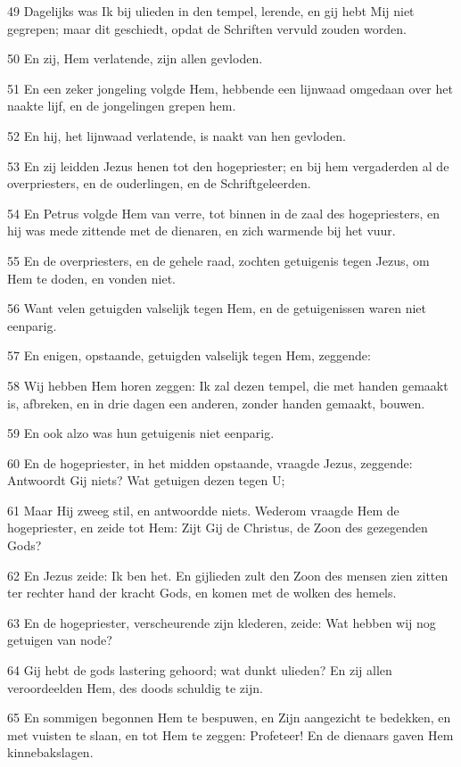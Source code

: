 \par 49 Dagelijks was Ik bij ulieden in den tempel, lerende, en gij hebt Mij niet gegrepen; maar dit geschiedt, opdat de Schriften vervuld zouden worden.
\par 50 En zij, Hem verlatende, zijn allen gevloden.
\par 51 En een zeker jongeling volgde Hem, hebbende een lijnwaad omgedaan over het naakte lijf, en de jongelingen grepen hem.
\par 52 En hij, het lijnwaad verlatende, is naakt van hen gevloden.
\par 53 En zij leidden Jezus henen tot den hogepriester; en bij hem vergaderden al de overpriesters, en de ouderlingen, en de Schriftgeleerden.
\par 54 En Petrus volgde Hem van verre, tot binnen in de zaal des hogepriesters, en hij was mede zittende met de dienaren, en zich warmende bij het vuur.
\par 55 En de overpriesters, en de gehele raad, zochten getuigenis tegen Jezus, om Hem te doden, en vonden niet.
\par 56 Want velen getuigden valselijk tegen Hem, en de getuigenissen waren niet eenparig.
\par 57 En enigen, opstaande, getuigden valselijk tegen Hem, zeggende:
\par 58 Wij hebben Hem horen zeggen: Ik zal dezen tempel, die met handen gemaakt is, afbreken, en in drie dagen een anderen, zonder handen gemaakt, bouwen.
\par 59 En ook alzo was hun getuigenis niet eenparig.
\par 60 En de hogepriester, in het midden opstaande, vraagde Jezus, zeggende: Antwoordt Gij niets? Wat getuigen dezen tegen U;
\par 61 Maar Hij zweeg stil, en antwoordde niets. Wederom vraagde Hem de hogepriester, en zeide tot Hem: Zijt Gij de Christus, de Zoon des gezegenden Gods?
\par 62 En Jezus zeide: Ik ben het. En gijlieden zult den Zoon des mensen zien zitten ter rechter hand der kracht Gods, en komen met de wolken des hemels.
\par 63 En de hogepriester, verscheurende zijn klederen, zeide: Wat hebben wij nog getuigen van node?
\par 64 Gij hebt de gods lastering gehoord; wat dunkt ulieden? En zij allen veroordeelden Hem, des doods schuldig te zijn.
\par 65 En sommigen begonnen Hem te bespuwen, en Zijn aangezicht te bedekken, en met vuisten te slaan, en tot Hem te zeggen: Profeteer! En de dienaars gaven Hem kinnebakslagen.
